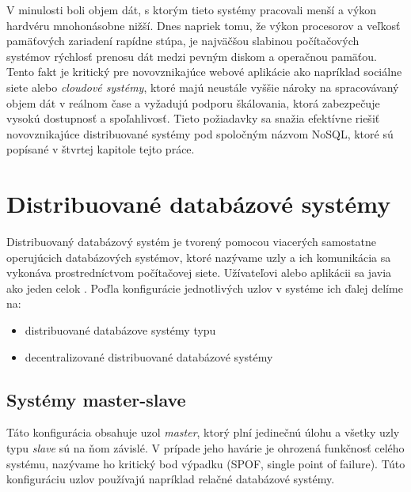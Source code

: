 \documentclass[11pt,twoside,a4paper]{book}
\begin{document}
V minulosti boli objem dát, s ktorým tieto systémy pracovali menší a výkon hardvéru mnohonásobne nižší. Dnes napriek tomu, že výkon procesorov a veľkosť pamäťových zariadení rapídne stúpa, je najväčšou slabinou počítačových systémov rýchlosť prenosu dát medzi pevným diskom a operačnou pamäťou. Tento fakt je kritický pre novovznikajúce webové aplikácie ako napríklad sociálne siete alebo \emph{cloudové systémy}, ktoré majú neustále vyššie nároky na spracovávaný objem dát v reálnom čase a vyžadujú podporu škálovania, ktorá zabezpečuje vysokú dostupnosť a spoľahlivosť. Tieto požiadavky sa snažia efektívne riešiť novovznikajúce distribuované systémy pod spoločným názvom NoSQL, ktoré sú popísané v štvrtej kapitole tejto práce. %


\section{Distribuované databázové systémy}
Distribuovaný databázový systém je tvorený pomocou viacerých samostatne operujúcich databázových systémov, ktoré nazývame uzly a ich komunikácia sa vykonáva prostredníctvom počítačovej siete. Užívateľovi alebo aplikácii sa javia ako jeden celok \cite{hewitt2010cassandra}. Poďla konfigurácie jednotlivých uzlov v systéme ich ďalej delíme na:
\begin{itemize}
 \item distribuované databázove systémy typu 
 \item decentralizované distribuované databázové systémy
\end{itemize}

\subsection*{Systémy master-slave} 

Táto konfigurácia obsahuje uzol \emph{master}, ktorý plní jedinečnú úlohu a všetky uzly typu \emph{slave} sú na ňom závislé. V prípade jeho havárie je ohrozená funkčnosť celého systému, nazývame ho kritický bod výpadku (SPOF, single point of failure). Túto konfiguráciu uzlov používajú napríklad relačné databázové systémy.
\end{document}
